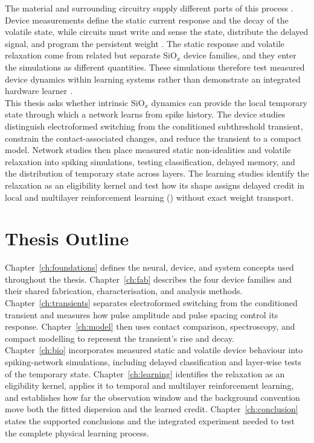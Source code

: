 \noindent The material and surrounding circuitry supply different parts of this process
\cite{zhang2020brain, mehonic2024review}. Device measurements define the static current response and the decay
of the volatile state, while circuits must write and sense the state, distribute the delayed signal, and program
the persistent weight \cite{chicca2020recipe, payvand2019spike}. The static response and volatile relaxation come
from related but separate SiO$_x$ device families, and they enter the simulations as different quantities. These
simulations therefore test measured device dynamics within learning systems rather than demonstrate an integrated
hardware learner \cite{prezioso2015training, valentian2019fully}.\\

\noindent This thesis asks whether intrinsic SiO$_x$ dynamics can provide the local temporary state through
which a network learns from spike history. The device studies distinguish electroformed switching from the
conditioned subthreshold transient, constrain the contact-associated changes, and reduce the transient to a
compact model. Network studies then place measured static non-idealities and volatile relaxation into spiking
simulations, testing classification, delayed memory, and the distribution of temporary state across layers. The
learning studies identify the relaxation as an eligibility kernel and test how its shape assigns delayed credit
in local and multilayer reinforcement learning () without exact weight transport.

\section[Thesis Outline]{Thesis Outline}

\noindent Chapter~\ref{ch:foundations} defines the neural, device, and system concepts used throughout the
thesis. Chapter~\ref{ch:fab} describes the four device families and their shared fabrication,
characterisation, and analysis methods. Chapter~\ref{ch:transients} separates electroformed switching from the
conditioned transient and measures how pulse amplitude and pulse spacing control its response.
Chapter~\ref{ch:model} then uses contact comparison, spectroscopy, and compact modelling to represent the
transient's rise and decay.\\

\noindent Chapter~\ref{ch:bio} incorporates measured static and volatile device behaviour into spiking-network
simulations, including delayed classification and layer-wise tests of the temporary state.
Chapter~\ref{ch:learning} identifies the relaxation as an eligibility kernel, applies it to temporal and
multilayer reinforcement learning, and establishes how far the observation window and the background convention
move both the fitted dispersion and the learned credit. Chapter~\ref{ch:conclusion} states the supported
conclusions and the integrated experiment needed to test the complete physical learning process.
